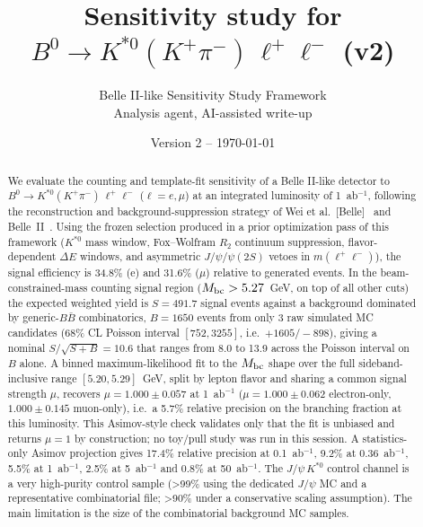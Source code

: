 \documentclass[11pt]{article}
\title{Sensitivity study for $B^0 \to K^{*0}(K^+\pi^-)\,\ell^+\ell^-$ (v2)}
\author{Belle II-like Sensitivity Study Framework \\ Analysis agent, AI-assisted write-up}
\date{Version 2 -- \today}
\begin{document}
\maketitle

\begin{center}
\end{center}

\begin{abstract}
We evaluate the counting and template-fit sensitivity of a Belle
II-like detector to $B^0 \to K^{*0}(K^+\pi^-)\,\ell^+\ell^-$
($\ell=e,\mu$) at an integrated luminosity of 1~ab$^{-1}$, following the
reconstruction and background-suppression strategy of Wei et
al.~[Belle]~\cite{Wei2009} and Belle~II~\cite{BelleII2022}. Using the
frozen selection produced in a prior optimization pass of this
framework ($K^{*0}$ mass window, Fox--Wolfram $R_2$ continuum
suppression, flavor-dependent $\Delta E$ windows, and asymmetric
$J/\psi$/$\psi(2S)$ vetoes in $m(\ell^+\ell^-)$), the signal efficiency
is 34.8\% (e) and 31.6\% ($\mu$) relative to generated events. In the
beam-constrained-mass counting signal region ($M_{\rm bc}>5.27$~GeV, on
top of all other cuts) the expected weighted yield is $S=491.7$ signal
events against a background dominated by generic-$B\bar B$
combinatorics, $B=1650$ events from only 3 raw simulated MC candidates
(68\% CL Poisson interval $[752,3255]$, i.e.\ $+1605/-898$), giving a
nominal $S/\sqrt{S+B}=10.6$ that ranges from 8.0 to 13.9 across the
Poisson interval on $B$ alone. A binned maximum-likelihood fit to the
$M_{\rm bc}$ shape over the full sideband-inclusive range
$[5.20,5.29]$~GeV, split by lepton flavor and sharing a common signal
strength $\mu$, recovers $\mu=1.000\pm0.057$ at 1~ab$^{-1}$
($\mu=1.000\pm0.062$ electron-only, $1.000\pm0.145$ muon-only), i.e.\ a
5.7\% relative precision on the branching fraction at this luminosity.
This Asimov-style check validates only that the fit is unbiased and
returns $\mu=1$ by construction; no toy/pull study was run in this
session. A statistics-only Asimov projection gives 17.4\% relative
precision at 0.1~ab$^{-1}$, 9.2\% at 0.36~ab$^{-1}$, 5.5\% at
1~ab$^{-1}$, 2.5\% at 5~ab$^{-1}$ and 0.8\% at 50~ab$^{-1}$. The
$J/\psi\,K^{*0}$ control channel is a very high-purity control sample
(>99\% using the dedicated $J/\psi$ MC and a representative
combinatorial file; >90\% under a conservative scaling assumption). The
main limitation is the size of the combinatorial background MC samples.
\end{abstract}
\end{document}
